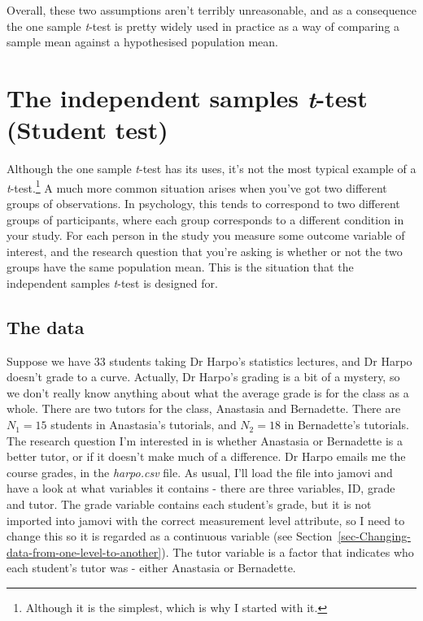 \documentclass[
  a4paper,
]{book}
\begin{document}
Overall, these two assumptions aren't terribly unreasonable, and as a
consequence the one sample \emph{t}-test is pretty widely used in
practice as a way of comparing a sample mean against a hypothesised
population mean.

\hypertarget{sec-the-independent-samples-t-test-student-test}{%
\section{\texorpdfstring{The independent samples \emph{t}-test (Student
test)}{The independent samples t-test (Student test)}}\label{sec-the-independent-samples-t-test-student-test}}

Although the one sample \emph{t}-test has its uses, it's not the most
typical example of a \emph{t}-test.\footnote{Although it is the
  simplest, which is why I started with it.} A much more common
situation arises when you've got two different groups of observations.
In psychology, this tends to correspond to two different groups of
participants, where each group corresponds to a different condition in
your study. For each person in the study you measure some outcome
variable of interest, and the research question that you're asking is
whether or not the two groups have the same population mean. This is the
situation that the independent samples \emph{t}-test is designed for.

\hypertarget{the-data}{%
\subsection{The data}\label{the-data}}

Suppose we have 33 students taking Dr Harpo's statistics lectures, and
Dr Harpo doesn't grade to a curve. Actually, Dr Harpo's grading is a bit
of a mystery, so we don't really know anything about what the average
grade is for the class as a whole. There are two tutors for the class,
Anastasia and Bernadette. There are \(N_1 = 15\) students in Anastasia's
tutorials, and \(N_2 = 18\) in Bernadette's tutorials. The research
question I'm interested in is whether Anastasia or Bernadette is a
better tutor, or if it doesn't make much of a difference. Dr Harpo
emails me the course grades, in the \emph{harpo.csv} file. As usual,
I'll load the file into jamovi and have a look at what variables it
contains - there are three variables, ID, grade and tutor. The grade
variable contains each student's grade, but it is not imported into
jamovi with the correct measurement level attribute, so I need to change
this so it is regarded as a continuous variable (see
Section~\ref{sec-Changing-data-from-one-level-to-another}). The tutor
variable is a factor that indicates who each student's tutor was -
either Anastasia or Bernadette.
\end{document}
